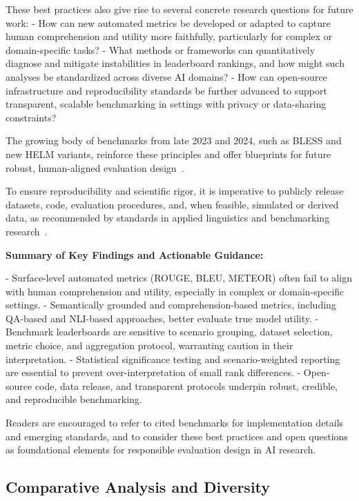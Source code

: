 \documentclass[sigconf]{acmart}
\begin{document}
These best practices also give rise to several concrete research questions for future work:
- How can new automated metrics be developed or adapted to capture human comprehension and utility more faithfully, particularly for complex or domain-specific tasks?
- What methods or frameworks can quantitatively diagnose and mitigate instabilities in leaderboard rankings, and how might such analyses be standardized across diverse AI domains?
- How can open-source infrastructure and reproducibility standards be further advanced to support transparent, scalable benchmarking in settings with privacy or data-sharing constraints?

The growing body of benchmarks from late 2023 and 2024, such as BLESS and new HELM variants, reinforce these principles and offer blueprints for future robust, human-aligned evaluation design~\cite{ref101,ref104,ref106}.

To ensure reproducibility and scientific rigor, it is imperative to publicly release datasets, code, evaluation procedures, and, when feasible, simulated or derived data, as recommended by standards in applied linguistics and benchmarking research~\cite{ref108}.

\textbf{Summary of Key Findings and Actionable Guidance:}

- Surface-level automated metrics (ROUGE, BLEU, METEOR) often fail to align with human comprehension and utility, especially in complex or domain-specific settings.
- Semantically grounded and comprehension-based metrics, including QA-based and NLI-based approaches, better evaluate true model utility.
- Benchmark leaderboards are sensitive to scenario grouping, dataset selection, metric choice, and aggregation protocol, warranting caution in their interpretation.
- Statistical significance testing and scenario-weighted reporting are essential to prevent over-interpretation of small rank differences.
- Open-source code, data release, and transparent protocols underpin robust, credible, and reproducible benchmarking.

Readers are encouraged to refer to cited benchmarks for implementation details and emerging standards, and to consider these best practices and open questions as foundational elements for responsible evaluation design in AI research.

\subsection{Comparative Analysis and Diversity}
\end{document}
